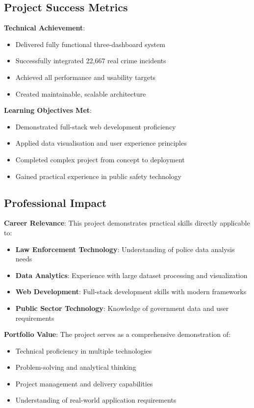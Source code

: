 \documentclass[12pt,a4paper]{article}
\begin{document}
\subsection{Project Success Metrics}

\textbf{Technical Achievement}:
\begin{itemize}
    \item[\checkmark] Delivered fully functional three-dashboard system
    \item[\checkmark] Successfully integrated 22,667 real crime incidents
    \item[\checkmark] Achieved all performance and usability targets
    \item[\checkmark] Created maintainable, scalable architecture
\end{itemize}

\textbf{Learning Objectives Met}:
\begin{itemize}
    \item[\checkmark] Demonstrated full-stack web development proficiency
    \item[\checkmark] Applied data visualisation and user experience principles
    \item[\checkmark] Completed complex project from concept to deployment
    \item[\checkmark] Gained practical experience in public safety technology
\end{itemize}

\subsection{Professional Impact}

\textbf{Career Relevance}:
This project demonstrates practical skills directly applicable to:
\begin{itemize}
    \item \textbf{Law Enforcement Technology}: Understanding of police data analysis needs
    \item \textbf{Data Analytics}: Experience with large dataset processing and visualization
    \item \textbf{Web Development}: Full-stack development skills with modern frameworks
    \item \textbf{Public Sector Technology}: Knowledge of government data and user requirements
\end{itemize}

\textbf{Portfolio Value}:
The project serves as a comprehensive demonstration of:
\begin{itemize}
    \item Technical proficiency in multiple technologies
    \item Problem-solving and analytical thinking
    \item Project management and delivery capabilities
    \item Understanding of real-world application requirements
\end{itemize}
\end{document}
